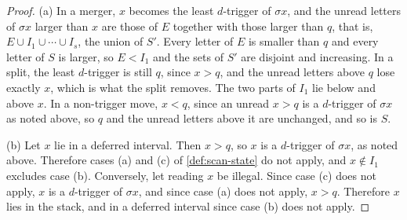 \documentclass[11pt,reqno]{amsart}
\theoremstyle{definition}
\theoremstyle{remark}
\begin{document}
\begin{proof}
(a) In a merger, $x$ becomes the least $d$-trigger of $\sigma x$, and the
unread letters of $\sigma x$ larger than $x$ are those of $E$ together with
those larger than $q$, that is, $E\cup I_1\cup\cdots\cup I_s$, the union of
$S'$.  Every letter of $E$ is smaller than $q$ and every letter of $S$ is
larger, so $E<I_1$ and the sets of $S'$ are disjoint and increasing.  In a
split, the least $d$-trigger is still $q$, since $x>q$, and the unread
letters above $q$ lose exactly $x$, which is what the split removes.  The two
parts of $I_1$ lie below and above $x$.  In a non-trigger move, $x<q$, since
an unread $x>q$ is a $d$-trigger of $\sigma x$ as noted above, so $q$ and the
unread letters above it are unchanged, and so is $S$.

(b) Let $x$ lie in a deferred interval.  Then $x>q$, so $x$ is a
$d$-trigger of $\sigma x$, as noted above.  Therefore cases (a)
and (c) of \cref{def:scan-state} do not apply, and $x\notin I_1$ excludes
case (b).  Conversely, let reading $x$ be illegal.  Since case (c) does not
apply, $x$ is a $d$-trigger of $\sigma x$, and since case (a) does not apply,
$x>q$.  Therefore $x$ lies in the
stack, and in a deferred interval since case (b) does not apply.
\end{proof}
\end{document}
